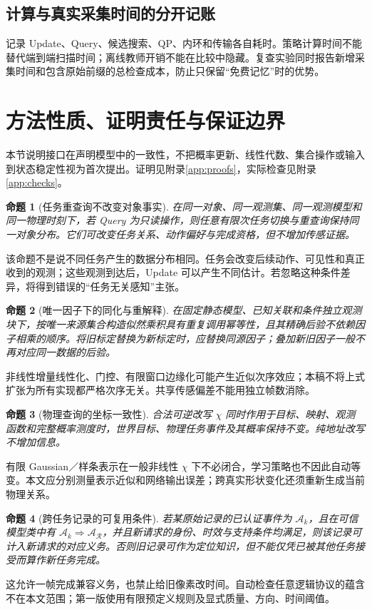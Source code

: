 \documentclass[UTF8,11pt,a4paper,fontset=fandol]{ctexart}
\numberwithin{equation}{section}
\newtheorem{proposition}{命题}[section]
\theoremstyle{definition}
\begin{document}
\subsection{计算与真实采集时间的分开记账}
记录 Update、Query、候选搜索、QP、内环和传输各自耗时。策略计算时间不能替代端到端扫描时间；离线教师开销不能在比较中隐藏。复查实验同时报告新增采集时间和包含原始前缀的总检查成本，防止只保留“免费记忆”时的优势。

\section{方法性质、证明责任与保证边界}
\label{sec:theory}
本节说明接口在声明模型中的一致性，不把概率更新、线性代数、集合操作或输入到状态稳定性视为首次提出。证明见附录\ref{app:proofs}，实际检查见附录\ref{app:checks}。

\begin{proposition}[任务重查询不改变对象事实]
在同一对象、同一观测集、同一观测模型和同一物理时刻下，若 Query 为只读操作，则任意有限次任务切换与重查询保持同一对象分布。它们可改变任务关系、动作偏好与完成资格，但不增加传感证据。
\label{prop:query}
\end{proposition}
该命题不是说不同任务产生的数据分布相同。任务会改变后续动作、可见性和真正收到的观测；这些观测到达后，Update 可以产生不同估计。若忽略这种条件差异，将得到错误的“任务无关感知”主张。

\begin{proposition}[唯一因子下的同化与重解释]
在固定静态模型、已知关联和条件独立观测块下，按唯一来源集合构造似然乘积具有重复调用幂等性，且其精确后验不依赖因子相乘的顺序。将旧标定替换为新标定时，应替换同源因子；叠加新旧因子一般不再对应同一数据的后验。
\label{prop:idempotence}
\end{proposition}
非线性增量线性化、门控、有限窗口边缘化可能产生近似次序效应；本稿不将上式扩张为所有实现都严格次序无关。共享传感偏差不能用独立帧数消除。

\begin{proposition}[物理查询的坐标一致性]
合法可逆改写 $\chi$ 同时作用于目标、映射、观测函数和完整概率测度时，世界目标、物理任务事件及其概率保持不变。纯地址改写不增加信息。
\label{prop:coordinate}
\end{proposition}
有限 Gaussian／样条表示在一般非线性 $\chi$ 下不必闭合，学习策略也不因此自动等变。本文应分别测量表示近似和网络输出误差；跨真实形状变化还须重新生成当前物理关系。

\begin{proposition}[跨任务记录的可复用条件]
若某原始记录的已认证事件为 $\mathcal A_k$，且在可信模型类中有 $\mathcal A_k\Rightarrow\mathcal A_{\mathcal R}$，并且新请求的身份、时效与支持条件均满足，则该记录可计入新请求的对应义务。否则旧记录可作为定位知识，但不能仅凭已被其他任务接受而算作新任务完成。
\label{prop:entailment}
\end{proposition}
这允许一帧完成兼容义务，也禁止给旧像素改时间。自动检查任意逻辑协议的蕴含不在本文范围；第一版使用有限预定义规则及显式质量、方向、时间阈值。
\end{document}
